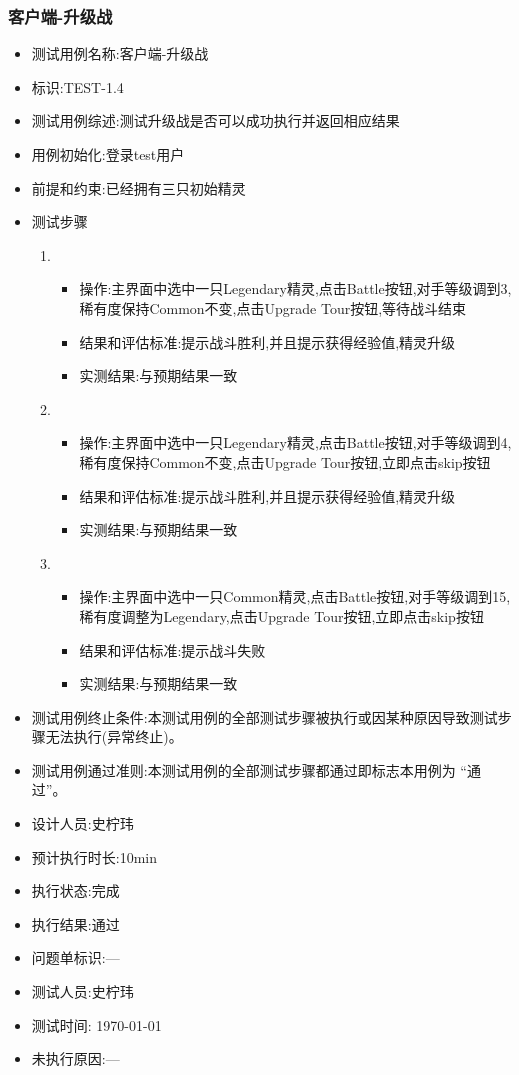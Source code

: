 \documentclass{article}
\begin{document}
\subsubsection{客户端-升级战}
\begin{itemize}
\item 测试用例名称:客户端-升级战
\item 标识:TEST-1.4
\item 测试用例综述:测试升级战是否可以成功执行并返回相应结果
\item 用例初始化:登录test用户
\item 前提和约束:已经拥有三只初始精灵
\item 测试步骤
  \begin{enumerate}
  \item
    \begin{itemize}
    \item 操作:主界面中选中一只Legendary精灵,点击Battle按钮,对手等级调到3,稀有度保持Common不变,点击Upgrade Tour按钮,等待战斗结束
    \item 结果和评估标准:提示战斗胜利,并且提示获得经验值,精灵升级
    \item 实测结果:与预期结果一致
    \end{itemize}
  \item
    \begin{itemize}
    \item 操作:主界面中选中一只Legendary精灵,点击Battle按钮,对手等级调到4,稀有度保持Common不变,点击Upgrade Tour按钮,立即点击skip按钮
    \item 结果和评估标准:提示战斗胜利,并且提示获得经验值,精灵升级
    \item 实测结果:与预期结果一致
    \end{itemize}

  \item
    \begin{itemize}
    \item 操作:主界面中选中一只Common精灵,点击Battle按钮,对手等级调到15,稀有度调整为Legendary,点击Upgrade Tour按钮,立即点击skip按钮
    \item 结果和评估标准:提示战斗失败
    \item 实测结果:与预期结果一致
    \end{itemize}



  \end{enumerate}
  
\item 测试用例终止条件:本测试用例的全部测试步骤被执行或因某种原因导致测试步骤无法执行(异常终止)。
\item 测试用例通过准则:本测试用例的全部测试步骤都通过即标志本用例为 “通过”。
\item 设计人员:史柠玮
\item 预计执行时长:10min
\item 执行状态:完成
\item 执行结果:通过
\item 问题单标识:---
\item 测试人员:史柠玮
\item 测试时间: \today
\item 未执行原因:---
\end{itemize}
\end{document}
